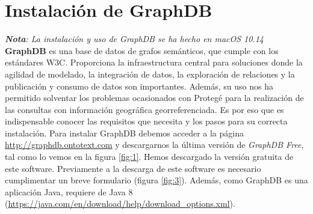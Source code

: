 \section*{Instalación de GraphDB}
\label{ch:ApendiceC}


\textit{\textbf{Nota}: La instalación y uso de GraphDB se ha hecho en macOS 10.14}\\

\textbf{GraphDB} es una base de datos de grafos semánticos, que cumple con los estándares W3C. Proporciona la infraestructura central para soluciones donde la agilidad de modelado, la integración de datos, la exploración de relaciones y la publicación y consumo de datos son importantes. Además, su uso nos ha permitido solventar los problemas ocasionados con Protegé para la realización de las consultas con información geográfica georreferenciada. Es por eso que es indispensable conocer las requisitos que necesita y los pasos para su correcta instalación. Para instalar GraphDB debemos acceder a la página \url{http://graphdb.ontotext.com} y descargarnos la última versión de \textit{GraphDB Free}, tal como lo vemos en la figura \ref{fig:1}. Hemos descargado la versión gratuita de este software. Previamente a la descarga de este software es necesario cumplimentar un breve formulario (figura \ref{fig:3}). Además, como GraphDB es una aplicación Java, requiere de Java 8 (\url{https://java.com/en/download/help/download_options.xml}).


